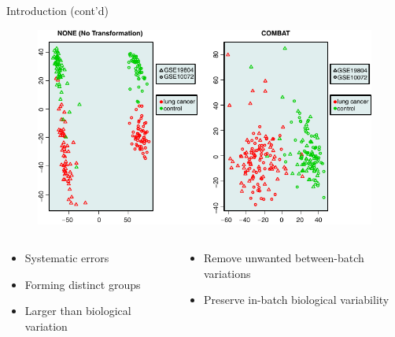 \documentclass{beamer}
\begin{document}

\begin{frame}{Introduction (cont'd)}
  \vspace{-1.3cm}
  \begin{figure}[ht]
    \centering
    \includegraphics[width=1.0\textwidth,
    height=0.5\textheight]{figures/12859_2012_5651_MOESM2_ESM.pdf}
    \vspace{-0.7cm}
    \caption*{\tiny{\cite{Taminau2012}}\label{fig:batch-effect}}
  \end{figure}
  \vspace{-1cm}
  \begin{columns}
    \begin{column}[t]{.48\textwidth}
      \begin{itemize}
        \item Systematic errors
        \item Forming distinct groups
        \item Larger than biological variation
      \end{itemize}
    \end{column}
    \begin{column}[t]{.48\textwidth}
      \begin{itemize}
        \item Remove unwanted between-batch variations
        \item Preserve in-batch biological variability
      \end{itemize}
    \end{column}
  \end{columns}
\end{frame}
\end{document}
